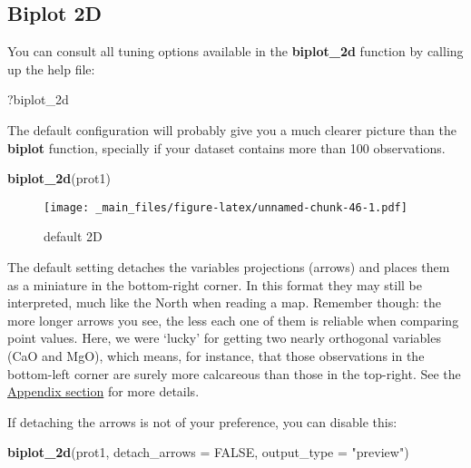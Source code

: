 \documentclass[12pt,]{book}
\newenvironment{Shaded}{\begin{snugshade}}{\end{snugshade}}
\newcommand{\DataTypeTok}[1]{\textcolor[rgb]{0.13,0.29,0.53}{#1}}
\newcommand{\KeywordTok}[1]{\textcolor[rgb]{0.13,0.29,0.53}{\textbf{#1}}}
\newcommand{\NormalTok}[1]{#1}
\newcommand{\OtherTok}[1]{\textcolor[rgb]{0.56,0.35,0.01}{#1}}
\newcommand{\StringTok}[1]{\textcolor[rgb]{0.31,0.60,0.02}{#1}}
\begin{document}
\pagebreak

\hypertarget{biplot-2d}{%
\subsection{Biplot 2D}\label{biplot-2d}}

You can consult all tuning options available in the \textbf{biplot\_2d} function by calling up the help file:

\begin{Shaded}
\begin{Highlighting}[]
\NormalTok{?biplot_2d}
\end{Highlighting}
\end{Shaded}

The default configuration will probably give you a much clearer picture than the \textbf{biplot} function, specially if your dataset contains more than 100 observations.

\begin{Shaded}
\begin{Highlighting}[]
\KeywordTok{biplot_2d}\NormalTok{(prot1)}
\end{Highlighting}
\end{Shaded}

\begin{figure}
\centering
\texttt{[image: \_main\_files/figure-latex/unnamed-chunk-46-1.pdf]}
\caption{\label{fig:unnamed-chunk-46}default 2D}
\end{figure}

\pagebreak

The default setting detaches the variables projections (arrows) and places them as a miniature in the bottom-right corner. In this format they may still be interpreted, much like the North when reading a map. Remember though: the more longer arrows you see, the less each one of them is reliable when comparing point values. Here, we were `lucky' for getting two nearly orthogonal variables (CaO and MgO), which means, for instance, that those observations in the bottom-left corner are surely more calcareous than those in the top-right. See the \href{8_Appendix_biplot.html}{Appendix section} for more details.

If detaching the arrows is not of your preference, you can disable this:

\begin{Shaded}
\begin{Highlighting}[]
\KeywordTok{biplot_2d}\NormalTok{(prot1, }
          \DataTypeTok{detach_arrows =} \OtherTok{FALSE}\NormalTok{, }
          \DataTypeTok{output_type =} \StringTok{"preview"}\NormalTok{)}
\end{Highlighting}
\end{Shaded}
\end{document}
